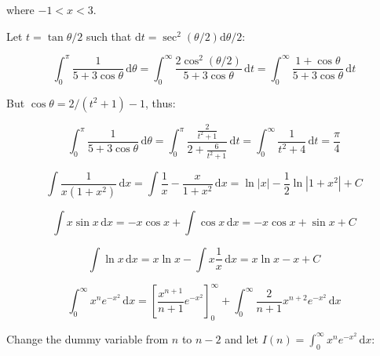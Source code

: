 \documentclass[12pt]{article}
\begin{document}
where $-1 < x < 3$.

Let $t = \tan{\theta/2}$ such that $\mathrm{d}t = \sec^{2}{(\theta/2)} \mathrm{d}\theta/2$:

\begin{equation}
    \int_{0}^{\pi} \frac{1}{5 + 3\cos{\theta}} \, \mathrm{d}\theta = \int_{0}^{\infty} \frac{2\cos^{2}{(\theta/2)}}{5 + 3\cos{\theta}} \, \mathrm{d}t = \int_{0}^{\infty} \frac{1 + \cos{\theta}}{5 + 3\cos{\theta}} \, \mathrm{d}t
\end{equation}

But $\cos{\theta} = 2/(t^{2} + 1) - 1$, thus:

\begin{equation}
    \int_{0}^{\pi} \frac{1}{5 + 3\cos{\theta}} \, \mathrm{d}\theta = \int_{0}^{\pi} \frac{\frac{2}{t^{2} + 1}}{2 + \frac{6}{t^{2} + 1}} \, \mathrm{d}t = \int_{0}^{\infty} \frac{1}{t^{2} + 4} \, \mathrm{d}t = \frac{\pi}{4}
\end{equation}


\begin{equation}
    \int \frac{1}{x(1 + x^{2})} \, \mathrm{d}x = \int \frac{1}{x} - \frac{x}{1 + x^{2}} \, \mathrm{d}x = \ln{\left\lvert x \right\rvert} - \frac{1}{2} \ln{\left\lvert 1 + x^{2} \right\rvert} + C
\end{equation}



\begin{equation}
    \int x \sin{x} \, \mathrm{d}x = -x \cos{x} + \int \cos{x} \, \mathrm{d}x = -x \cos{x} + \sin{x} + C
\end{equation}


\begin{equation}
    \int \ln{x} \, \mathrm{d}x = x \ln{x} - \int x \frac{1}{x} \, \mathrm{d}x = x \ln{x} - x + C
\end{equation}


\begin{equation}
    \int_{0}^{\infty} x^{n} e^{-x^{2}} \, \mathrm{d}x = \left[ \frac{x^{n + 1}}{n + 1} e^{-x^{2}} \right]_{0}^{\infty} + \int_{0}^{\infty} \frac{2}{n + 1} x^{n + 2} e^{-x^{2}} \, \mathrm{d}x
\end{equation}

Change the dummy variable from $n$ to $n - 2$ and let $I(n) = \int_{0}^{\infty} x^{n} e^{-x^{2}} \, \mathrm{d}x$:
\end{document}
